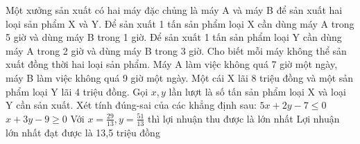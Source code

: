 \begin{ex}
 Một xưởng sản xuất có hai máy đặc chủng là máy A và máy B để sản xuất hai loại sản phẩm X và Y. Để sản xuất 1 tấn sản phẩm loại X cần dùng máy A trong 5 giờ và dùng máy B trong 1 giờ. Để sản xuất 1 tấn sản phẩm loại Y cần dùng máy A trong 2 giờ và dùng máy B trong 3 giờ. Cho biết mỗi máy không thể sản xuất đồng thời hai loại sản phẩm. Máy A làm việc không quá 7 giờ một ngày, máy B làm việc không quá 9 giờ một ngày. Một cái X lãi 8 triệu đồng và một sản phẩm loại Y lãi 4 triệu đồng. Gọi ${x,y}$ lần lượt là số tấn sản phẩm loại X và loại Y cần sản xuất. Xét tính đúng-sai của các khẳng định sau:
\choiceTFt
{ \True  $5 x + 2 y - 7 \le 0$ }
   { $x + 3 y - 9 \ge 0$ }
     { Với $x = \frac{29}{13}, y = \frac{51}{13}$ thì lợi nhuận thu được là lớn nhất }
    { \True  Lợi nhuận lớn nhất đạt được là 13,5 triệu đồng }
\end{ex}

